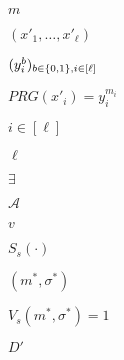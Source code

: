 \documentclass[10pt]{book}
\begin{document}
\begin{mdSnippets}
\begin{mdInlineSnippet}[6f8f57715090da2632453988d9a1501b]%
$m$\end{mdInlineSnippet}%
\begin{mdInlineSnippet}%
$(x'_1,\ldots,x'_\ell)$\end{mdInlineSnippet}%
\begin{mdInlineSnippet}[a1566f663365b491ca8c407a246c819a]%
$( y^b_i )_{b\in\{0,1\},i\in[\ell]}$\end{mdInlineSnippet}%
\begin{mdInlineSnippet}[c07b7d10e5645b07df2d0072f2e5a1d1]%
$PRG(x'_i)=y^{m_i}_i$\end{mdInlineSnippet}%
\begin{mdInlineSnippet}[c6dff587263841761d855b2a6272fd8a]%
$i\in[\ell]$\end{mdInlineSnippet}%
\begin{mdInlineSnippet}[ee5e5c003694e7cd5ae404923c665edb]%
$\ell$\end{mdInlineSnippet}%
\begin{mdInlineSnippet}%
$\exists$\end{mdInlineSnippet}%
\begin{mdInlineSnippet}[ad70146b431bea9ae74cf8385470c544]%
$\mathcal{A}$\end{mdInlineSnippet}%
\begin{mdInlineSnippet}[9e3669d19b675bd57058fd4664205d2a]%
$v$\end{mdInlineSnippet}%
\begin{mdInlineSnippet}[4aa00f16d316206a5d003b8b9a2a9bde]%
$S_s(\cdot)$\end{mdInlineSnippet}%
\begin{mdInlineSnippet}%
$(m^*,\sigma^*)$\end{mdInlineSnippet}%
\begin{mdInlineSnippet}[d3f2d9f156dc06e3631b2a95ddd931d5]%
$V_s(m^*,\sigma^*) = 1$\end{mdInlineSnippet}%
\begin{mdInlineSnippet}[0232f27be40b2b647f260050dd308eb8]%
$D'$\end{mdInlineSnippet}%

\end{mdSnippets}
\end{document}
